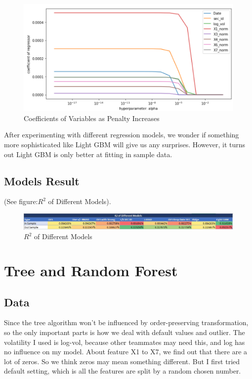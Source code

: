 \documentclass[onecolumn]{article}
\begin{document}
\begin{figure}[H]
\centering
\includegraphics[scale=0.6]{LASSO.PNG}
\caption{Coefficients of Variables as Penalty Increases}
\label{fig:label}
\end{figure}

\indent After experimenting with different regression models, we wonder if something more sophisticated like Light GBM will give us any surprises. However, it turns out Light GBM is only better at fitting in sample data.\\





\subsection{Models Result}
(See figure:$R^{2}$ of Different Models).
\begin{figure}[ht]
\centering
\includegraphics[scale=0.6]{Regression_Performance_V2.JPG}
\caption{$R^{2}$ of Different Models}
\label{fig:label}
\end{figure}




\section{Tree and Random Forest}
\subsection{Data}
Since the tree algorithm won't be influenced by order-preserving transformation, so the only important parts is how we deal with default values and outlier. The volatility I used is log-vol, because other teammates may need this, and log has no influence on my model. About feature X1 to X7, we find out that there are a lot of zeros. So we think zeros may mean something different. But I first tried default setting, which is all the features are split by a random chosen number.
\end{document}

